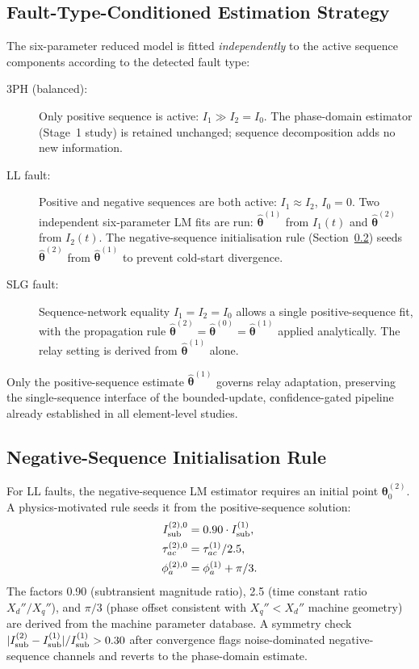\subsection{Fault-Type-Conditioned Estimation Strategy}

The six-parameter reduced model is fitted \emph{independently} to the
active sequence components according to the detected fault type:
\begin{description}
  \item[3PH (balanced):] Only positive sequence is active: $I_1 \gg I_2 = I_0$.
    The phase-domain estimator (Stage~1 study) is retained unchanged;
    sequence decomposition adds no new information.
  \item[LL fault:] Positive and negative sequences are both active:
    $I_1 \approx I_2$, $I_0 = 0$.  Two independent six-parameter LM fits are
    run: $\hat{\bm{\theta}}^{(1)}$ from $I_1(t)$ and $\hat{\bm{\theta}}^{(2)}$
    from $I_2(t)$.  The negative-sequence initialisation rule
    (Section~\ref{sec:ch7_ns_init}) seeds $\hat{\bm{\theta}}^{(2)}$ from
    $\hat{\bm{\theta}}^{(1)}$ to prevent cold-start divergence.
  \item[SLG fault:] Sequence-network equality $I_1 = I_2 = I_0$ allows a
    single positive-sequence fit, with the propagation rule
    $\hat{\bm{\theta}}^{(2)} = \hat{\bm{\theta}}^{(0)} = \hat{\bm{\theta}}^{(1)}$
    applied analytically.  The relay setting is derived from
    $\hat{\bm{\theta}}^{(1)}$ alone.
\end{description}

Only the positive-sequence estimate $\hat{\bm{\theta}}^{(1)}$ governs relay
adaptation, preserving the single-sequence interface of the bounded-update,
confidence-gated pipeline already established in all element-level studies.

\subsection{Negative-Sequence Initialisation Rule}
\label{sec:ch7_ns_init}

For LL faults, the negative-sequence LM estimator requires an initial point
$\bm{\theta}_0^{(2)}$.  A physics-motivated rule seeds it from the
positive-sequence solution:
\begin{align}
  I_{\rm sub}^{(2),0} &= 0.90 \cdot I_{\rm sub}^{(1)}, \label{eq:ch7_ns1}\\
  \tau_{ac}^{(2),0}   &= \tau_{ac}^{(1)} / 2.5,          \label{eq:ch7_ns2}\\
  \phi_a^{(2),0}      &= \phi_a^{(1)} + \pi/3.           \label{eq:ch7_ns3}
\end{align}
The factors 0.90 (subtransient magnitude ratio), 2.5 (time constant ratio
$X_d''/X_q''$), and $\pi/3$ (phase offset consistent with $X_q'' < X_d''$
machine geometry) are derived from the machine parameter database.
A symmetry check $|I_{\rm sub}^{(2)} - I_{\rm sub}^{(1)}| / I_{\rm sub}^{(1)} > 0.30$
after convergence flags noise-dominated negative-sequence channels and
reverts to the phase-domain estimate.

